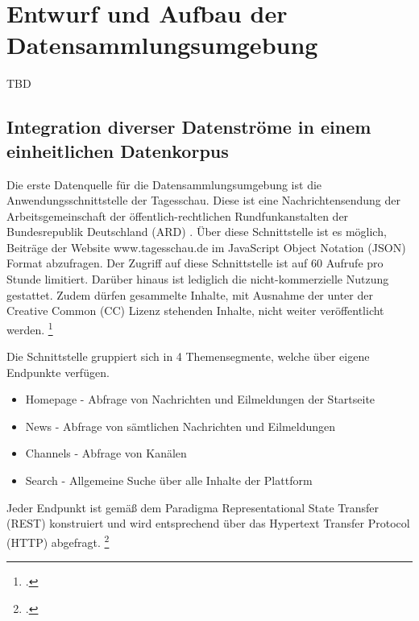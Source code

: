 \newpage
\section{Entwurf und Aufbau der Datensammlungsumgebung}
TBD

\subsection{Integration diverser Datenströme in einem einheitlichen Datenkorpus}
Die erste Datenquelle für die Datensammlungsumgebung ist die Anwendungsschnittstelle der Tagesschau. Diese ist eine Nachrichtensendung der Arbeitsgemeinschaft der öffentlich-rechtlichen Rundfunkanstalten der Bundesrepublik Deutschland (ARD) . Über diese Schnittstelle ist es möglich, Beiträge der Website www.tagesschau.de im JavaScript Object Notation (JSON) Format abzufragen. Der Zugriff auf diese Schnittstelle ist auf 60 Aufrufe pro Stunde limitiert. Darüber hinaus ist lediglich die nicht-kommerzielle Nutzung gestattet. Zudem dürfen gesammelte Inhalte, mit Ausnahme der unter der Creative Common (CC) Lizenz stehenden Inhalte, nicht weiter veröffentlicht werden. \footcite [Vgl.][]{TagesschauAPI}

Die Schnittstelle gruppiert sich in 4 Themensegmente, welche über eigene Endpunkte verfügen. 
\begin{itemize}
    \item Homepage - Abfrage von Nachrichten und Eilmeldungen der Startseite
    \item News - Abfrage von sämtlichen Nachrichten und Eilmeldungen
    \item Channels - Abfrage von Kanälen
    \item Search - Allgemeine Suche über alle Inhalte der Plattform
\end{itemize}
Jeder Endpunkt ist gemäß dem Paradigma Representational State Transfer (REST) konstruiert und wird entsprechend über das Hypertext Transfer Protocol (HTTP) abgefragt. \footcite [Vgl.][]{TagesschauAPI}


